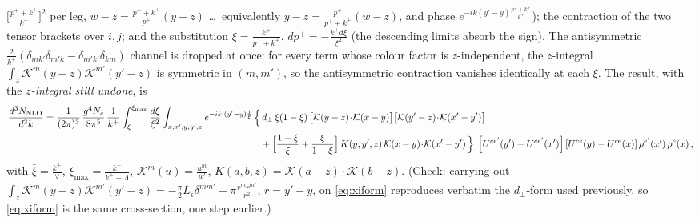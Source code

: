 \documentclass[9pt]{article}
\newcommand{\Leps}{L_{\epsilon}}
\newcommand{\KK}{\mathcal K(x-y)\!\cdot\!\mathcal K(x'-y')}
\newcommand{\Wyy}{\left[U^{ce'}(y') - U^{ce'}(x')\right] \left[U^{ce}(y) - U^{ce}(x)\right] \rho^{e'}(x')\, \rho^{e}(x)}
\begin{document}
$\big[\frac{p^{+}+k^{+}}{k^{+}}\big]^{2}$ per leg, $w-z=\frac{p^{+}+k^{+}}{p^{+}}(y-z)$
\dots\ equivalently $y-z=\frac{p^{+}}{p^{+}+k^{+}}(w-z)$, and phase
$e^{-ik(y'-y)\frac{p^{+}+k^{+}}{k^{+}}}$); the contraction of the two tensor brackets over
$i,j$; and the substitution $\xi=\frac{k^{+}}{p^{+}+k^{+}}$,
$dp^{+}=-\frac{k^{+}d\xi}{\xi^{2}}$ (the descending limits absorb the sign). The antisymmetric
$\frac{2}{k^{+}}\left(\delta_{mk'}\delta_{m'k}-\delta_{m'k'}\delta_{km}\right)$ channel is
dropped at once: for every term whose colour factor is $z$-independent, the $z$-integral
$\int_{z}\mathcal K^{m}(y-z)\mathcal K^{m'}(y'-z)$ is symmetric in $(m,m')$, so the
antisymmetric contraction vanishes identically at each $\xi$. The result, with the
\emph{$z$-integral still undone}, is
\begin{align}\label{eq:xiform}
\frac{d^{3}N_{\rm NLO}}{d^{3}k}
=\frac{1}{(2\pi)^{3}}\,\frac{g^{4}N_{c}}{8\pi^{5}}\,\frac{1}{k^{+}}
\int_{\bar\xi}^{\xi_{\max}}\frac{d\xi}{\xi^{2}}
\int_{x,x',y,y',z} e^{-ik\cdot(y'-y)\frac{1}{\xi}}\,
\Big\{&\,d_{\perp}\,\xi(1-\xi)\,\big[\mathcal K(y-z)\!\cdot\!\mathcal K(x-y)\big]\big[\mathcal K(y'-z)\!\cdot\!\mathcal K(x'-y')\big]\notag\\
&+\Big[\frac{1-\xi}{\xi}+\frac{\xi}{1-\xi}\Big]\,K(y,y',z)\,\KK\,\Big\}\;\Wyy\,,
\end{align}
with $\bar\xi=\frac{k^{+}}{\vee}$, $\xi_{\max}=\frac{k^{+}}{k^{+}+\Lambda}$,
$\mathcal K^{m}(u)=\frac{u^{m}}{u^{2}}$, $K(a,b,z)=\mathcal K(a-z)\!\cdot\!\mathcal K(b-z)$.
(Check: carrying out $\int_{z}\mathcal K^{m}(y-z)\mathcal K^{m'}(y'-z)
=-\frac{\pi}{2}\Leps\delta^{mm'}-\pi\frac{r^{m}r^{m'}}{r^{2}}$, $r=y'-y$, on
\eqref{eq:xiform} reproduces verbatim the $d_{\perp}$-form used previously, so
\eqref{eq:xiform} is the same cross-section, one step earlier.)
\end{document}
